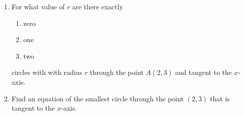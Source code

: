 \documentclass{ximera}
\begin{document}
\begin{question}
\begin{enumerate}
\item For what value of $r$ are there exactly 

\begin{enumerate}
\item zero

\item one

\item two
\end{enumerate}
circles with with radius $r$ through the point $A(2,3)$ and tangent to the $x$-axis.

\item Find an equation of the smallest circle through the point $(2,3)$ that is tangent to the $x$-axis.
\end{enumerate}
\end{question}
\end{document}
